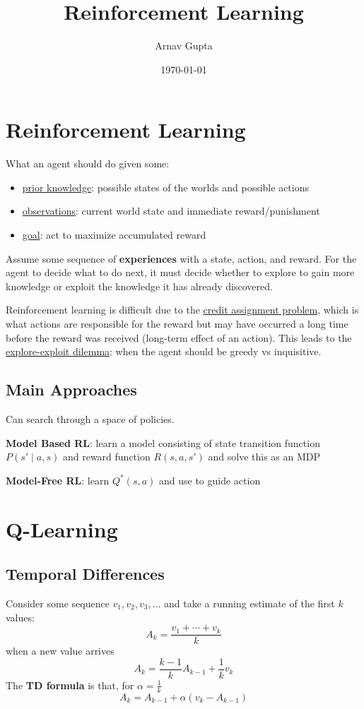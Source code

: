 \documentclass[11pt]{article}
\author{Arnav Gupta}
\date{\today}
\title{Reinforcement Learning}
\begin{document}
\maketitle
\tableofcontents

\section{Reinforcement Learning}
\label{sec:org383568b}
What an agent should do given some:
\begin{itemize}
\item \uline{prior knowledge}: possible states of the worlds and possible actions
\item \uline{observations}: current world state and immediate reward/punishment
\item \uline{goal}: act to maximize accumulated reward
\end{itemize}

Assume some sequence of \textbf{experiences} with a state, action, and reward.
For the agent to decide what to do next, it must decide whether to explore to gain more knowledge
or exploit the knowledge it has already discovered.

Reinforcement learning is difficult due to the \uline{credit assignment problem}, which is what actions
are responsible for the reward but may have occurred a long time before the reward was received
(long-term effect of an action).
This leads to the \uline{explore-exploit dilemma}: when the agent should be greedy vs inquisitive.
\subsection{Main Approaches}
\label{sec:orgb8de291}
Can search through a space of policies.

\textbf{Model Based RL}: learn a model consisting of state transition function \(P(s' \mid a, s)\) and
reward function \(R(s, a, s')\) and solve this as an MDP

\textbf{Model-Free RL}: learn \(Q^{*}(s,a)\) and use to guide action
\section{Q-Learning}
\label{sec:orga31b221}
\subsection{Temporal Differences}
\label{sec:org751606c}
Consider some sequence \(v_{1}, v_{2}, v_{3}, \dots\) and take a running estimate of the first \(k\)
values:
$$ A_{k} = \frac{v_{1} + \cdots + v_{k}}{k} $$
when a new value arrives
$$ A_{k} = \frac{k-1}{k} A_{k-1} + \frac{1}{k} v_{k} $$
The \textbf{TD formula} is that, for \(\alpha = \frac{1}{k}\)
$$ A_{k} = A_{k-1} + \alpha (v_{k} - A_{k-1}) $$
\end{document}
